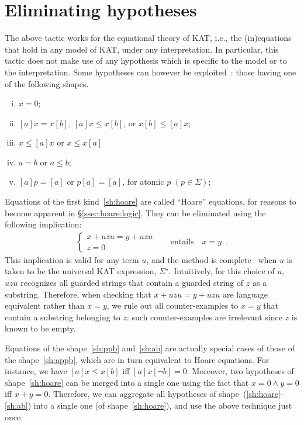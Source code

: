 \documentclass[a4paper]{llncs}
\begin{document}
\section{Eliminating hypotheses}
\label{sec:helim}

The above  tactic works for the equational theory of KAT,
i.e., the (in)equations that hold in any model of KAT, under any
interpretation.  In particular, this tactic does not make use of any
hypothesis which is specific to the model or to the interpretation.
Some hypotheses can however be
exploited~\cite{cohen94:ka:hypotheses,hardink02:kat:hypotheses}: those
having one of the following shapes.
\begin{enumerate}[(i)]
\item\label{sh:hoare} $x = 0$;
\item\label{sh:appb} $[a]x = x[b]$, $[a]x \le x[b]$, or $x[b] \le [a]x$;
\item\label{sh:ppb} $x \le [a]x$ or $x \le x[a]$
\item\label{sh:ab} $a = b$ or $a \le b$;
\item\label{sh:cpc} $[a]p = [a]$ or $p[a] = [a]$, for atomic $p$ $(p\in\Sigma)$;
\end{enumerate}

Equations of the first kind~\eqref{sh:hoare} are called ``Hoare''
equations, for reasons to become apparent in
§\ref{ssec:hoare:logic}. They can be eliminated using the following
implication:
\begin{align}
  \label{eq:elim:hoare}
  \tag{$\dag$}
  \begin{cases}
    x+uzu = y+uzu \\ z=0
  \end{cases}
  &\quad\text{entails}\quad x=y\enspace.
\end{align}
This implication is valid for any term $u$, and the method is
complete~\cite{hardink02:kat:hypotheses} when $u$ is taken to be the
universal KAT expression, $\Sigma^\star$.
Intuitively, for this choice of $u$, $uzu$ recognizes all guarded
strings that contain a guarded string of $z$ as a
substring. Therefore, when checking that $x+uzu = y+uzu$ are language
equivalent rather than $x=y$, we rule out all counter-examples to
$x=y$ that contain a substring belonging to $z$: such counter-examples
are irrelevant since $z$ is known to be empty.

\medskip

Equations of the shape~\eqref{sh:ppb} and~\eqref{sh:ab} are actually
special cases of those of the shape~\eqref{sh:appb}, which are in turn
equivalent to Hoare equations. For instance, we have $[a]x \le x[b]$
iff $[a]x[\neg b] = 0$.
Moreover, two hypotheses of shape~\eqref{sh:hoare} can be merged into
a single one using the fact that $x=0 \land y=0$ iff
$x+y=0$. Therefore, we can aggregate all hypotheses of
shape~(\ref{sh:hoare}-\ref{sh:ab}) into a single one (of
shape~\eqref{sh:hoare}), and use the above technique just once.
\end{document}
